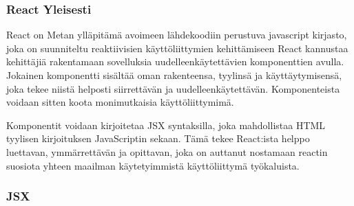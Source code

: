 

\subsubsection{React Yleisesti}















React on Metan ylläpitämä avoimeen lähdekoodiin perustuva javascript kirjasto,
joka on suunniteltu reaktiivisien käyttöliittymien kehittämiseen
React kannustaa kehittäjiä rakentamaan sovelluksia uudelleenkäytettävien komponenttien avulla.
Jokainen komponentti sisältää oman rakenteensa, tyylinsä ja käyttäytymisensä, joka tekee niistä helposti siirrettävän ja uudelleenkäytettävän.
Komponenteista voidaan sitten koota monimutkaisia käyttöliittymimä. 
\medskip


Komponentit voidaan kirjoitetaa JSX syntaksilla, joka mahdollistaa HTML tyylisen kirjoituksen JavaScriptin sekaan.
Tämä tekee React:ista helppo luettavan, ymmärrettävän ja opittavan, joka on auttanut nostamaan reactin suosiota yhteen maailman käytetyimmistä käyttöliittymä työkaluista.
\medskip









\subsubsection{JSX}







